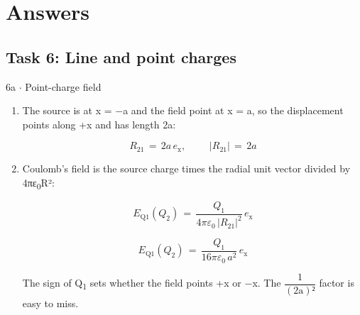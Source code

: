 \documentclass[11pt]{article}
\begin{document}
\section{Answers}
\begin{keepsection}\subsection{Task 6: Line and point charges}

\begin{workedbox}{6a \ensuremath{\cdot} Point-charge field}
\begin{enumerate}
\item {}
The source is at x = \ensuremath{-}a and the field point at x = a, so the displacement points along +x and has length 2a:

\begin{equation*}{R}_{21}\, =\, 2{a}\, {e}_{\mathrm{x}},\quad \, \quad \, |{R}_{21}|\, =\, 2{a}\end{equation*}
\item {}
Coulomb’s field is the source charge times the radial unit vector divided by 4πε\textsubscript{0}R²:

\begin{equation*}{E}_{\mathrm{Q}1}({Q}_{2})\, =\, \dfrac{{Q}_{1}}{4πε_{0}\, |{R}_{21}|^{2}}\, {e}_{\mathrm{x}}\end{equation*}

\begin{equation*}{E}_{\mathrm{Q}1}({Q}_{2})\, =\, \dfrac{{Q}_{1}}{16πε_{0}\, {a}^{2}}\, {e}_{\mathrm{x}}\end{equation*}

The sign of Q\textsubscript{1} sets whether the field points +x or \ensuremath{-}x. The {\small\ensuremath{\dfrac{1}{(2\mathrm{a})²}}} factor is easy to miss.
\end{enumerate}
\end{workedbox}

\end{keepsection}
\end{document}
